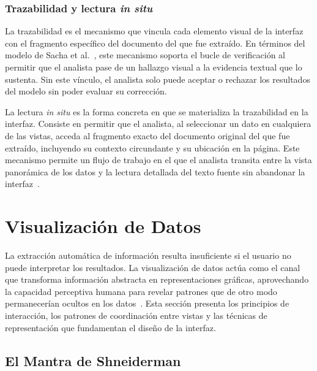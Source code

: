 \subsubsection{Trazabilidad y lectura \textit{in situ}}
\label{sec:trazabilidad}

La trazabilidad es el mecanismo que vincula cada 
elemento visual de la interfaz con el fragmento 
específico del documento del que fue extraído. En 
términos del modelo de Sacha et al.~\cite{sacha2014}, 
este mecanismo soporta el bucle de verificación al 
permitir que el analista pase de un hallazgo visual a 
la evidencia textual que lo sustenta. Sin este vínculo, 
el analista solo puede aceptar o rechazar los resultados 
del modelo sin poder evaluar su corrección.

La lectura \textit{in situ} es la forma concreta en que 
se materializa la trazabilidad en la interfaz. Consiste 
en permitir que el analista, al seleccionar un dato en 
cualquiera de las vistas, acceda al fragmento exacto 
del documento original del que fue extraído, incluyendo 
su contexto circundante y su ubicación en la página. 
Este mecanismo permite un flujo de trabajo en el que 
el analista transita entre la vista panorámica de los 
datos y la lectura detallada del texto fuente sin 
abandonar la interfaz~\cite{thomas2005illuminating}.







\section{Visualización de Datos}
\label{sec:tecnicas_vis}

La extracción automática de información resulta 
insuficiente si el usuario no puede interpretar los 
resultados. La visualización de datos actúa como el 
canal que transforma información abstracta en 
representaciones gráficas, aprovechando la capacidad 
perceptiva humana para revelar patrones que de otro 
modo permanecerían ocultos en los 
datos~\cite{ortigossa2025time}. Esta sección presenta 
los principios de interacción, los patrones de 
coordinación entre vistas y las técnicas de 
representación que fundamentan el diseño de la 
interfaz.


\subsection{El Mantra de Shneiderman}
\label{sec:shneiderman}

